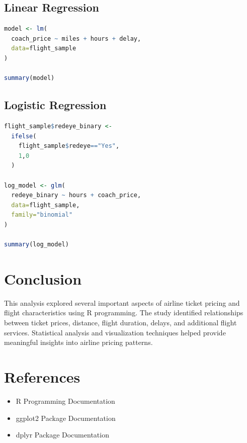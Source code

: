 \documentclass[12pt,a4paper]{article}
\begin{document}
\subsection{Linear Regression}

\begin{lstlisting}[language=R]
model <- lm(
  coach_price ~ miles + hours + delay,
  data=flight_sample
)

summary(model)
\end{lstlisting}

\subsection{Logistic Regression}

\begin{lstlisting}[language=R]
flight_sample$redeye_binary <-
  ifelse(
    flight_sample$redeye=="Yes",
    1,0
  )

log_model <- glm(
  redeye_binary ~ hours + coach_price,
  data=flight_sample,
  family="binomial"
)

summary(log_model)
\end{lstlisting}

\section{Conclusion}
This analysis explored several important aspects of airline ticket pricing and flight characteristics using R programming. The study identified relationships between ticket prices, distance, flight duration, delays, and additional flight services. Statistical analysis and visualization techniques helped provide meaningful insights into airline pricing patterns.

\section{References}
\begin{itemize}
    \item R Programming Documentation
    \item ggplot2 Package Documentation
    \item dplyr Package Documentation
\end{itemize}
\end{document}
